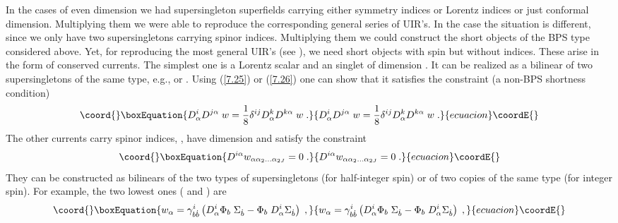 \documentclass[a4paper,12pt]{article}
\begin{document}
In the cases of even dimension \coordHE{} we had supersingleton 
superfields carrying either \coordHE{} symmetry indices or Lorentz 
indices or just conformal dimension. Multiplying them we were 
able to reproduce the corresponding general series of UIR's. In 
the case \coordHE{} the situation is different, since we only have two 
supersingletons carrying \coordHE{} spinor indices. 
Multiplying them we could construct the short objects of the BPS 
type considered above. Yet, for reproducing the most general 
UIR's (see \cite{Minw2}), we need short objects with spin but 
without \coordHE{} indices. These arise in the form of 
conserved currents. The simplest one is a Lorentz scalar and an 
\coordHE{} singlet \coordHE{} of dimension \coordHE{}. It can be 
realized as a bilinear of two supersingletons of the same type, 
e.g., \coordHE{} or \coordHE{}. 
Using (\ref{7.25}) or (\ref{7.26}) one can show that it satisfies 
the constraint (a non-BPS shortness condition) 
\begin{equation}\coord{}\boxEquation{\label{7.001}
  D^i_\alpha D^{j\alpha} \; w = 
{1\over 8}\delta^{ij} D^k_\alpha D^{k\alpha} \; w \;.
}{D^i_\alpha D^{j\alpha} \; w = 
{1\over 8}\delta^{ij} D^k_\alpha D^{k\alpha} \; w \;.
}{ecuacion}\coordE{}\end{equation}
The other currents carry \coordHE{} spinor indices, 
\coordHE{}, have dimension \coordHE{} and 
satisfy the constraint \cite{Park3d} 
\begin{equation}\coord{}\boxEquation{\label{7.002}
  D^{i\alpha}w_{\alpha\alpha_2\ldots\alpha_{2J}} = 0\;.
}{D^{i\alpha}w_{\alpha\alpha_2\ldots\alpha_{2J}} = 0\;.
}{ecuacion}\coordE{}\end{equation}
They can be constructed as bilinears of the two types of 
supersingletons (for half-integer spin) or of  two copies of the 
same type (for integer spin). For example, the two lowest ones 
(\coordHE{} and \coordHE{}) are 
\begin{equation}\coord{}\boxEquation{\label{7.0020}
  w_\alpha = \gamma^i_{b\dot b}\left(D^i_\alpha \Phi_b\;\Sigma_{\dot b} - 
\Phi_b\;  D^i_\alpha\Sigma_{\dot b} \right)\;, 
}{w_\alpha = \gamma^i_{b\dot b}\left(D^i_\alpha \Phi_b\;\Sigma_{\dot b} - 
\Phi_b\;  D^i_\alpha\Sigma_{\dot b} \right)\;, 
}{ecuacion}\coordE{}\end{equation}
\end{document}
